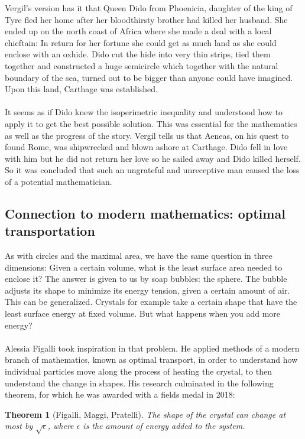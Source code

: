 \documentclass[12pt, a4paper, titlepage]{article}
\newtheorem{thm}{Theorem}
\begin{document}
Vergil's version has it that Queen Dido from Phoenicia, daughter of the king of Tyre fled her home after her bloodthirsty brother had killed her husband. She ended up on the north coast of Africa where she made a deal with a local chieftain: In return for her fortune she could get as much land as she could enclose with an oxhide. Dido cut the hide into very thin strips, tied them together and constructed a huge semicircle which together with the natural boundary of the sea, turned out to be bigger than anyone could have imagined. Upon this land, Carthage was established.\\\\
It seems as if Dido knew the isoperimetric inequality and understood how to apply it to get the best possible solution. 
This was essential for the mathematics as well as the progress of the story. Vergil tells us that Aeneas, on his quest to found Rome, was shipwrecked and blown ashore at Carthage. Dido fell in love with him but he did not return her love so he sailed away and Dido killed herself. So it was concluded that such an ungrateful and unreceptive man caused the loss of a potential mathematician.
\subsection{Connection to modern mathematics: optimal transportation}
As with circles and the maximal area, we have the same question in three dimensions: Given a certain volume, what is the least surface area needed to enclose it? The answer is given to us by soap bubbles: the sphere. The bubble adjusts its shape to minimize its energy tension, given a certain amount of air.
This can be generalized. Crystals for example take a certain shape that have the least surface energy at fixed volume. But what happens when you add more energy?\\
\\
Alessia Figalli took inspiration in that problem. He applied methods of a modern branch of mathematics, known as optimal transport, in order to understand how individual particles move along the process of heating the crystal, to then understand the change in shapes. His research culminated in the following theorem, for which he was awarded with a fields medal in 2018:
\begin{thm}[Figalli, Maggi, Pratelli]
The shape of the crystal can change at most by $\sqrt{\epsilon}$, where $\epsilon$ is the amount of energy added to the system.

\end{thm}
\end{document}
